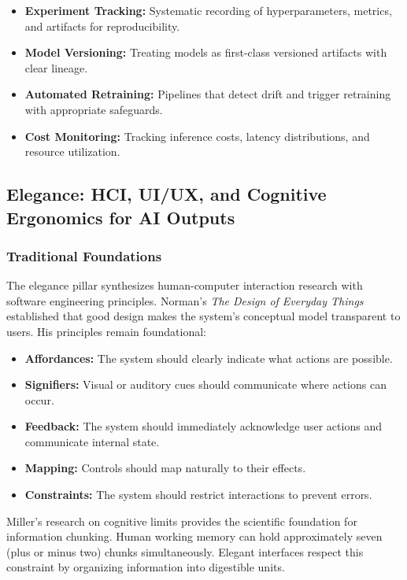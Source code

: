 \documentclass[11pt,a4paper]{article}
\begin{document}
\begin{itemize}[leftmargin=2em]
    \item \textbf{Experiment Tracking:} Systematic recording of hyperparameters, metrics, and artifacts for reproducibility.
    \item \textbf{Model Versioning:} Treating models as first-class versioned artifacts with clear lineage.
    \item \textbf{Automated Retraining:} Pipelines that detect drift and trigger retraining with appropriate safeguards.
    \item \textbf{Cost Monitoring:} Tracking inference costs, latency distributions, and resource utilization.
\end{itemize}


\subsection{Elegance: HCI, UI/UX, and Cognitive Ergonomics for AI Outputs}

\subsubsection{Traditional Foundations}

The elegance pillar synthesizes human-computer interaction research with software engineering principles. Norman's \emph{The Design of Everyday Things} \cite{norman2013design} established that good design makes the system's conceptual model transparent to users. His principles remain foundational:

\begin{itemize}[leftmargin=2em]
    \item \textbf{Affordances:} The system should clearly indicate what actions are possible.
    \item \textbf{Signifiers:} Visual or auditory cues should communicate where actions can occur.
    \item \textbf{Feedback:} The system should immediately acknowledge user actions and communicate internal state.
    \item \textbf{Mapping:} Controls should map naturally to their effects.
    \item \textbf{Constraints:} The system should restrict interactions to prevent errors.
\end{itemize}

Miller's research on cognitive limits \cite{miller1956magical} provides the scientific foundation for information chunking. Human working memory can hold approximately seven (plus or minus two) chunks simultaneously. Elegant interfaces respect this constraint by organizing information into digestible units.
\end{document}
